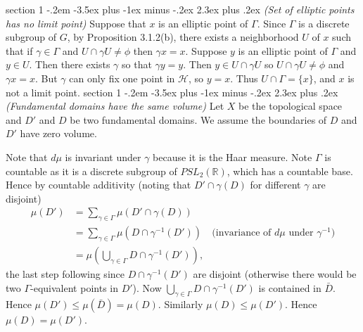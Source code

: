 \documentclass[12pt]{article}
\makeatletter
\theoremstyle{norm}
\newcommand{\R}[0]{\mathbb{R}}
\newcommand{\subeq}[0]{\subseteq}
\newcommand{\ga}[0]{\gamma}
\newcommand{\Ga}[0]{\Gamma}
\newcommand{\pa}[1]{\left( {#1} \right)}
\newenvironment{problem}{\@startsection
       {section}
       {1}
       {-.2em}
       {-3.5ex plus -1ex minus -.2ex}
       {2.3ex plus .2ex}
       {\pagebreak[3]%
       \large\bf\noindent{Problem }
       }
       }
       {%
       }
\makeatother
\begin{document}
\begin{problem} {\it (Set of elliptic points has no limit point)}
Suppose that $x$ is an elliptic point of $\Ga$. Since $\Ga$ is a discrete subgroup of $G$, by Proposition 3.1.2(b), there exists a neighborhood $U$ of $x$ such that if $\ga\in \Ga$ and $U\cap \ga U\neq \phi$ then $\ga x=x$. Suppose $y$ is an elliptic point of $\Ga$ and $y\in U$. Then there exists $\ga$ so that $\ga y=y$. Then $y\in U\cap \ga U$ so $U\cap\ga U\neq \phi$ and $\ga x=x$. But $\ga$ can only fix one point in $\mathcal H$, so
$y=x$. Thus $U\cap \Ga=\{x\}$, and $x$ is not a limit point.
\end{problem}
\begin{problem} {\it (Fundamental domains have the same volume)}
Let $X$ be the topological space and $D'$ and $D$ be two fundamental domains. We assume the boundaries of $D$ and $D'$ have zero volume. %

Note that $d\mu$ is invariant under $\ga$ because it is the Haar measure. Note $\Ga$ is countable as it is a discrete subgroup of $PSL_2(\R)$, which has a countable base. Hence by countable additivity (noting that  $D'\cap \ga(%
D)$ for different $\ga$ %
are disjoint) %
\begin{align*}
\mu(D')&=\sum_{\ga\in \Ga} \mu(D'\cap \ga(%
D))\\
&=\sum_{\ga\in \Ga}\mu(%
D\cap \ga^{-1}(D'))&\text{(invariance of }d\mu\text{ under }\ga^{-1})\\
&=\mu\pa{\bigcup_{\ga\in \Ga}%
 D\cap \ga^{-1}(D')},
\end{align*}
the last step following since $%
D \cap \ga^{-1}(D')$ are disjoint (otherwise there would be two $\Ga$-equivalent points in $D'$). 
Now $\bigcup_{\ga\in \Ga} D\cap \ga^{-1}(D')$ is contained in $\bar D$. Hence $\mu(D')\leq \mu(\bar D)=\mu(D)$. Similarly $\mu(D)\leq \mu(D')$. Hence $\mu(D)=\mu(D')$.

\end{problem}
\end{document}
